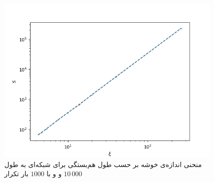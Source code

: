 \documentclass[11pt, a4paper]{article}
\begin{document}
\begin{figure}[h!]
  \centering
  \includegraphics[width=.7\textwidth]{q7_size_radii_0.5_0.01_0.6_1000_10000}
  \caption{منحنی اندازه‌ی خوشه بر حسب طول هم‌بستگی برای شبکه‌ای به طول $10\,000$ و و با $1000$ بار تکرار}
  \label{fig:q7_size_radii}
\end{figure}
\end{document}
